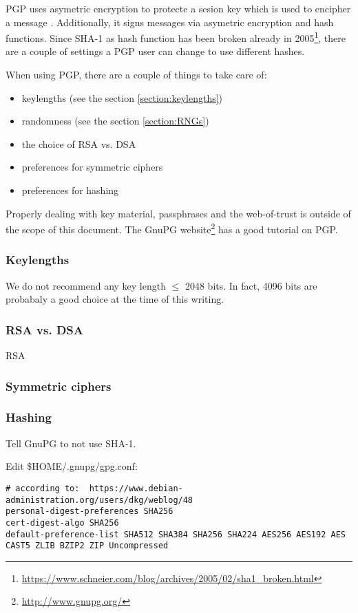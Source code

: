 
PGP uses asymetric encryption to protecte a sesion key which is used to encipher a message . Additionally, it signs messages via asymetric encryption and hash functions.
Since SHA-1 as hash function has been broken already in 2005\footnote{\url{https://www.schneier.com/blog/archives/2005/02/sha1\_broken.html}}, there are a couple of settings a PGP user can change to use different hashes.

When using PGP, there are a couple of things to take care of:
\begin{itemize}
\item keylengths (see the section \ref{section:keylengths})
\item randomness (see the section \ref{section:RNGs})
\item the choice of RSA vs. DSA 
\item preferences for symmetric ciphers
\item preferences for hashing
\end{itemize}

Properly dealing with key material, passphrases and the web-of-trust is outside of the scope of this document. The GnuPG website\footnote{\url{http://www.gnupg.org/}} has a good tutorial on PGP.

\subsubsection{Keylengths}
We do not recommend any key length $\le$ 2048 bits. In fact, 4096 bits are probabaly a good choice at the time of this writing.

\subsubsection{RSA vs. DSA}
RSA%

\subsubsection{Symmetric ciphers}


\subsubsection{Hashing}
Tell GnuPG to not use SHA-1.

Edit \$HOME/.gnupg/gpg.conf:

\begin{lstlisting}[breaklines]
# according to:  https://www.debian-administration.org/users/dkg/weblog/48
personal-digest-preferences SHA256
cert-digest-algo SHA256
default-preference-list SHA512 SHA384 SHA256 SHA224 AES256 AES192 AES CAST5 ZLIB BZIP2 ZIP Uncompressed
\end{lstlisting}

